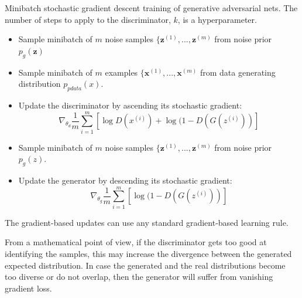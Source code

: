 \begin{algorithm}
\caption{Minibatch stochastic gradient descent training of generative adversarial nets. The number of steps to apply to the discriminator, $k$, is a hyperparameter.}
\begin{algorithmic}
\label{alg:training optimisation}
         \Statex\begin{itemize}
         \setlength{\itemindent}{.2in}
             \item Sample minibatch of $m$ noise samples $\{ \mathbf{z}^{(1)}, ..., \mathbf{z}^{(m)}$ from noise prior $p_g(\mathbf{z})$
             \item Sample minibatch of $m$ examples $\{ \mathbf{x}^{(1)}, ..., \mathbf{x}^{(m)}$ from data generating distribution $p_{pdata}(x)$.
             \item Update the discriminator by ascending its stochastic gradient: 
                \begin{equation}
                \label{eq:update rule discriminator}
                    \nabla_{\theta_d}\frac{1}{m}\sum_{i=1}^m [ \log D(x^{(i)}) + \log (1 - D(G(z^{(i)})) ]
                \end{equation}
         \end{itemize}
    \EndFor
    \begin{itemize}
     \setlength{\itemindent}{.2in}
        \item Sample minibatch of $m$ noise samples $\{ \mathbf{z}^{(1)}, ..., \mathbf{z}^{(m)}$ from noise prior $p_g(z)$. 
        \item Update the generator by descending its stochastic gradient:
        \begin{equation}
        \label{eq:update rule generator}
            \nabla_{\theta_g}\frac{1}{m}\sum_{i=1}^m [ \log (1 - D(G(z^{(i)})) ]
        \end{equation}
    \end{itemize}
\EndFor
\end{algorithmic}
The gradient-based updates can use any standard gradient-based learning rule.
\end{algorithm}


\noindent From a mathematical point of view, if the discriminator gets too good at identifying the samples, this may increase the divergence between the generated expected distribution. In case the generated and the real distributions become too diverse or do not overlap, then the generator will suffer from vanishing gradient loss.

